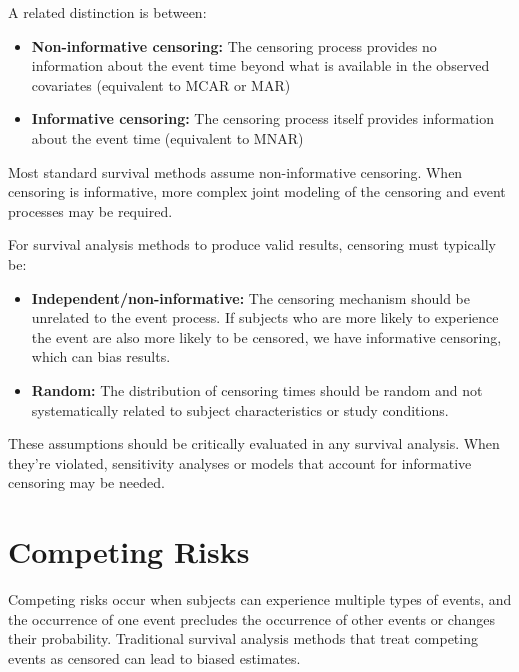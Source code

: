 \begin{notebox}[title=Non-informative vs. Informative Censoring]
A related distinction is between:
\begin{itemize}
    \item \textbf{Non-informative censoring:} The censoring process provides no information about the event time beyond what is available in the observed covariates (equivalent to MCAR or MAR)
    \item \textbf{Informative censoring:} The censoring process itself provides information about the event time (equivalent to MNAR)
\end{itemize}

Most standard survival methods assume non-informative censoring. When censoring is informative, more complex joint modeling of the censoring and event processes may be required.
\end{notebox}

For survival analysis methods to produce valid results, censoring must typically be:

\begin{itemize}
    \item \textbf{Independent/non-informative:} The censoring mechanism should be unrelated to the event process. If subjects who are more likely to experience the event are also more likely to be censored, we have informative censoring, which can bias results.
    
    \item \textbf{Random:} The distribution of censoring times should be random and not systematically related to subject characteristics or study conditions.
\end{itemize}

These assumptions should be critically evaluated in any survival analysis. When they're violated, sensitivity analyses or models that account for informative censoring may be needed.

\section{Competing Risks}
\label{sec:competing-risks}

Competing risks occur when subjects can experience multiple types of events, and the occurrence of one event precludes the occurrence of other events or changes their probability. Traditional survival analysis methods that treat competing events as censored can lead to biased estimates.

